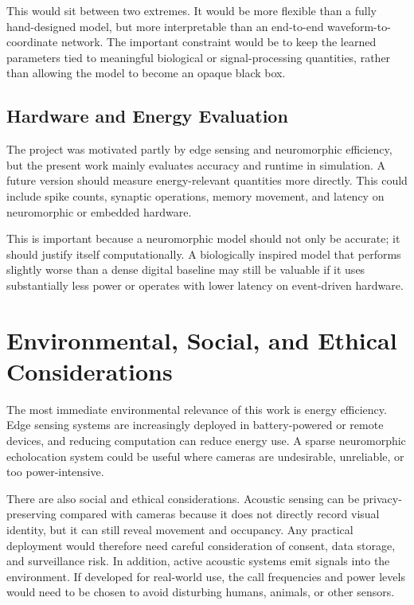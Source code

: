 This would sit between two extremes. It would be more flexible than a fully hand-designed model, but more interpretable than an end-to-end waveform-to-coordinate network. The important constraint would be to keep the learned parameters tied to meaningful biological or signal-processing quantities, rather than allowing the model to become an opaque black box.

\subsection{Hardware and Energy Evaluation}

The project was motivated partly by edge sensing and neuromorphic efficiency, but the present work mainly evaluates accuracy and runtime in simulation. A future version should measure energy-relevant quantities more directly. This could include spike counts, synaptic operations, memory movement, and latency on neuromorphic or embedded hardware.

This is important because a neuromorphic model should not only be accurate; it should justify itself computationally. A biologically inspired model that performs slightly worse than a dense digital baseline may still be valuable if it uses substantially less power or operates with lower latency on event-driven hardware.

\section{Environmental, Social, and Ethical Considerations}

The most immediate environmental relevance of this work is energy efficiency. Edge sensing systems are increasingly deployed in battery-powered or remote devices, and reducing computation can reduce energy use. A sparse neuromorphic echolocation system could be useful where cameras are undesirable, unreliable, or too power-intensive.

There are also social and ethical considerations. Acoustic sensing can be privacy-preserving compared with cameras because it does not directly record visual identity, but it can still reveal movement and occupancy. Any practical deployment would therefore need careful consideration of consent, data storage, and surveillance risk. In addition, active acoustic systems emit signals into the environment. If developed for real-world use, the call frequencies and power levels would need to be chosen to avoid disturbing humans, animals, or other sensors.

